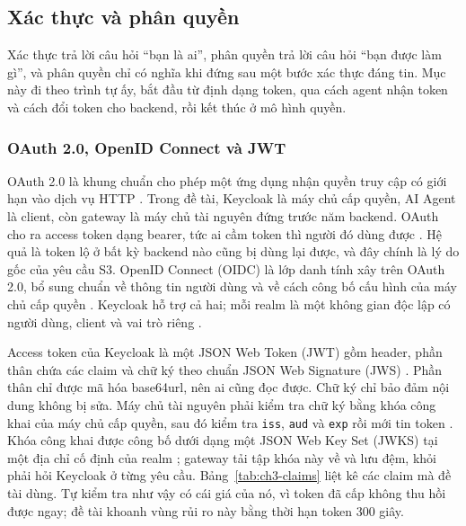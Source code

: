 \subsection{Xác thực và phân quyền}

Xác thực trả lời câu hỏi ``bạn là ai'', phân quyền trả lời câu hỏi ``bạn được làm gì'', và phân quyền chỉ có nghĩa khi đứng sau một bước xác thực đáng tin. Mục này đi theo trình tự ấy, bắt đầu từ định dạng token, qua cách agent nhận token và cách đổi token cho backend, rồi kết thúc ở mô hình quyền.

\subsubsection{OAuth 2.0, OpenID Connect và JWT}

OAuth 2.0 là khung chuẩn cho phép một ứng dụng nhận quyền truy cập có giới hạn vào dịch vụ HTTP \parencite{rfc6749}. Trong đề tài, Keycloak là máy chủ cấp quyền, AI Agent là client, còn gateway là máy chủ tài nguyên đứng trước năm backend. OAuth cho ra access token dạng bearer, tức ai cầm token thì người đó dùng được \parencite{rfc6750}. Hệ quả là token lộ ở bất kỳ backend nào cũng bị dùng lại được, và đây chính là lý do gốc của yêu cầu S3. OpenID Connect (OIDC) là lớp danh tính xây trên OAuth 2.0, bổ sung chuẩn về thông tin người dùng và về cách công bố cấu hình của máy chủ cấp quyền \parencite{oidc_core}. Keycloak hỗ trợ cả hai; mỗi realm là một không gian độc lập có người dùng, client và vai trò riêng \parencite{keycloak}.

Access token của Keycloak là một JSON Web Token (JWT) gồm header, phần thân chứa các claim và chữ ký theo chuẩn JSON Web Signature (JWS) \parencite{rfc7519,rfc7515}. Phần thân chỉ được mã hóa base64url, nên ai cũng đọc được. Chữ ký chỉ bảo đảm nội dung không bị sửa. Máy chủ tài nguyên phải kiểm tra chữ ký bằng khóa công khai của máy chủ cấp quyền, sau đó kiểm tra \texttt{iss}, \texttt{aud} và \texttt{exp} rồi mới tin token \parencite{rfc9068}. Khóa công khai được công bố dưới dạng một JSON Web Key Set (JWKS) tại một địa chỉ cố định của realm \parencite{rfc7517}; gateway tải tập khóa này về và lưu đệm, khỏi phải hỏi Keycloak ở từng yêu cầu. Bảng~\ref{tab:ch3-claims} liệt kê các claim mà đề tài dùng. Tự kiểm tra như vậy có cái giá của nó, vì token đã cấp không thu hồi được ngay; đề tài khoanh vùng rủi ro này bằng thời hạn token 300 giây.

